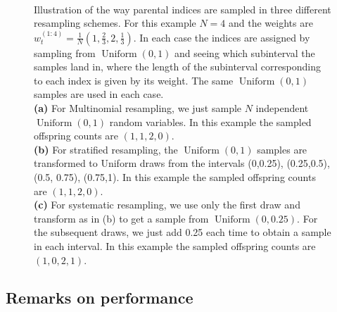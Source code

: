 \documentclass[fleqn]{article}
\theoremstyle{definition}
\newcommand{\Unif}{\operatorname{Uniform}}
\newcommand{\wt}[2][t]{w_{#1}^{(#2)}}
\begin{document}
\begin{figure}
{
\label{fig:resampling_systematic}
}\\
\caption{Illustration of the way parental indices are sampled in three different resampling schemes. For this example $N=4$ and the weights are $\wt{1:4} = \frac{1}{N}(1,\frac{2}{3},2,\frac{1}{3})$. In each case the indices are assigned by sampling from $\Unif(0,1)$ and seeing which subinterval the samples land in, where the length of the subinterval corresponding to each index is given by its weight. The same $\Unif(0,1)$ samples are used in each case.\\
\textbf{(a)} For Multinomial resampling, we just sample $N$  independent $\Unif(0,1)$ random variables. In this example the sampled offspring counts are $(1,1,2,0)$.\\
\textbf{(b)} For stratified resampling, the $\Unif(0,1)$ samples are transformed to Uniform draws from the intervals (0,0.25), (0.25,0.5), (0.5, 0.75), (0.75,1). In this example the sampled offspring counts are $(1,1,2,0)$.\\
\textbf{(c)} For systematic resampling, we use only the first draw and transform as in (b) to get a sample from $\Unif(0,0.25)$. For the subsequent draws, we just add 0.25 each time to obtain a sample in each interval. In this example the sampled offspring counts are $(1,0,2,1)$.}
\end{figure}

\subsection{Remarks on performance}
\end{document}
